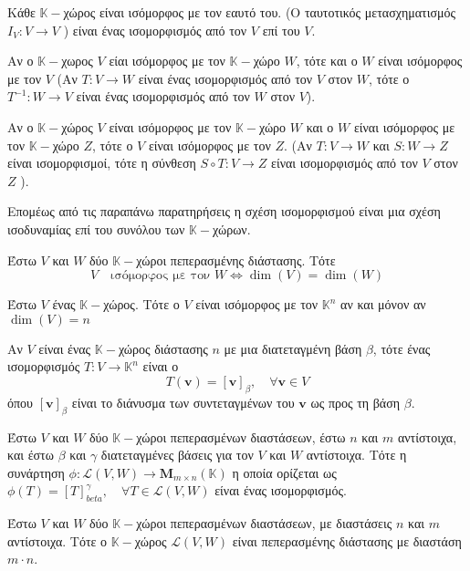 \begin{rem}
  Κάθε $ \mathbb{K}- $χώρος είναι ισόμορφος με τον εαυτό του. (Ο ταυτοτικός 
  μετασχηματισμός $ I_{V} \colon V \to V $ ) είναι ένας ισομορφισμός από τον $V$ επί 
  του $V$.
\end{rem}

\begin{rem}
  Αν ο $ \mathbb{K}- $χωρος $V$ είαι ισόμορφος με τον $ \mathbb{K}- $χώρο $W$, τότε 
  και ο $W$ είναι ισόμορφος με τον $V$ (Αν $ T \colon V \to W $ είναι ένας ισομορφισμός 
  από τον $V$ στον $W$, τότε ο $ T^{-1} \colon W \to V $ είναι ένας ισομορφισμός από 
  τον $W$ στον $V$). 
\end{rem}

\begin{rem}
  Αν ο $ \mathbb{K}- $χώρος $V$ είναι ισόμορφος με τον $ \mathbb{K}- $χώρο $W$ και ο 
  $W$ είναι ισόμορφος με τον $ \mathbb{K}- $χώρο $Z$, τότε ο $V$ είναι ισόμορφος με 
  τον $Z$. (Αν $ T \colon V \to W $ και $ S \colon W\to Z $ είναι ισομορφισμοί, τότε 
  η σύνθεση $ S \circ T \colon V \to Z$ είναι ισομορφισμός από τον $V$ στον $ Z $ ).
\end{rem}

Επομέως από τις παραπάνω παρατηρήσεις η σχέση ισομορφισμού είναι μια σχέση 
ισοδυναμίας επί του συνόλου των $ \mathbb{K}- $χώρων.

\begin{thm}
  Έστω $V$ και $W$ δύο $ \mathbb{K}- $χώροι πεπερασμένης διάστασης. Τότε
\[
  V \quad \text{ισόμορφος με τον $W$} \Leftrightarrow \dim(V) = \dim(W)   
 \] 
\end{thm}

\begin{cor}
  Έστω $V$ ένας $ \mathbb{K}- $χώρος. Τότε ο $V$ είναι ισόμορφος με τον 
  $ \mathbb{K}^{n} $ αν και μόνον αν $ \dim(V) = n $ 
\end{cor}

\begin{rem}
  Αν $ V $ είναι ένας $ \mathbb{K}- $χώρος διάστασης $n$ με μια διατεταγμένη βάση 
  $\beta$, τότε ένας ισομορφισμός $ T \colon V \to \mathbb{K}^{n} $ είναι ο 
  \[
    T(\mathbf{v}) = [\mathbf{v}]_{\beta}, \quad \forall \mathbf{v} \in V
   \] 
   όπου $ [\mathbf{v}]_{\beta} $ είναι το διάνυσμα των συντεταγμένων του $ \mathbf{v} $ 
   ως προς τη βάση $\beta$. 
\end{rem}

\begin{thm}
  Έστω $V$ και $W$ δύο $ \mathbb{K}- $χώροι πεπερασμένων διαστάσεων, έστω $n$ και 
  $ m $ αντίστοιχα, και έστω $\beta$ και $\gamma$ διατεταγμένες βάσεις για τον $V$ και 
  $W$ αντίστοιχα. Τότε η συνάρτηση $ \phi \colon \mathcal{L}(V,W) \to 
  \textbf{M}_{m \times n}(\mathbb{K})  $ η οποία ορίζεται ως 
  $ \phi (T) = [T]_{beta}^{\gamma}, \quad \forall 
  T \in \mathcal{L}(V,W) $ είναι ένας ισομορφισμός.
\end{thm}

\begin{cor}
  Έστω $V$ και $W$ δύο $ \mathbb{K}- $χώροι πεπερασμένων διαστάσεων, με διαστάσεις 
  $ n $ και $ m $ αντίστοιχα. Τότε ο $ \mathbb{K}- $χώρος $ \mathcal{L}(V,W) $ είναι 
  πεπερασμένης διάστασης με διαστάση $ m \cdot n $.
\end{cor}


